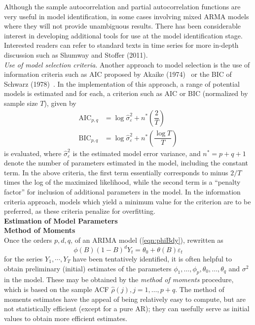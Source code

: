Although the sample autocorrelation and partial autocorrelation functions are very useful in model identification, in some cases involving mixed ARMA models where they will not provide unambiguous results. There has been considerable interest in developing additional tools for use at the model identification stage. Interested readers can refer to standard texts in time series for more in-depth discussion such as Shumway and Stoffer (2011)\cite{shumway2011arima}. \\


\noindent\textit{Use of model selection criteria}. Another approach to model selection is the use of information criteria such as AIC proposed by Akaike (1974)~\cite{akaike74} or the BIC of Schwarz (1978)~\cite{sch78}. In the implementation of this approach, a range of potential models is estimated and for each, a criterion such as AIC or BIC (normalized by sample size $T$), given by
	\begin{equation}\label{eqn:aicbic}
	\begin{split}
	\text{AIC}_{p,q}&= \log \hat{\sigma}_\varepsilon^2 + n^* \left( \dfrac{2}{T} \right) \\
	\text{BIC}_{p,q}&=\log\hat{\sigma}_\varepsilon^2 + n^* \left( \dfrac{\log T}{T} \right)
	\end{split}
	\end{equation}
is evaluated, where $\hat{\sigma}_\varepsilon^2$ is the estimated model error variance, and $n^*=p+q+1$ denote the number of parameters estimated in the model, including the constant term. In the above criteria, the first term essentially corresponds to minus $2/T$ times the log of the maximized likelihood, while the second term is a ``penalty factor'' for inclusion of additional parameters in the model. In the information criteria approach, models which yield a minimum value for the criterion are to be preferred, as these criteria penalize for overfitting. \\


\noindent\textbf{Estimation of Model Parameters} \\

\noindent \textbf{Method of Moments} \\


Once the orders $p,d,q$, of an ARIMA model (\ref{eqn:phiBdy}), rewritten as 
	\begin{equation}\label{eqn:phiB}
	\phi(B)(1 - B)^dY_t = \theta_0 + \theta(B)\varepsilon_t
	\end{equation}
for the series $Y_1,\cdots,Y_T$ have been tentatively identified, it is often helpful to obtain preliminary (initial) estimates of the parameters $\phi_1,\ldots,\phi_p,\theta_0,\ldots,\theta_q$ and $\sigma^2$ in the model. These may be obtained by the \textit{method of moments} procedure, which is based on the sample ACF $\hat{\rho}(j),j=1,\ldots,p+q$. The method of moments estimates have the appeal of being relatively easy to compute, but are not statistically efficient (except for a pure AR); they can usefully serve as initial values to obtain more efficient estimates.


